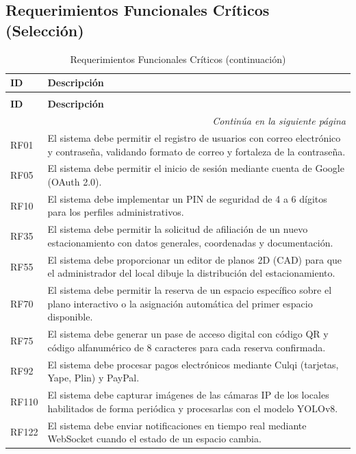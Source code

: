 \subsection{Requerimientos Funcionales Críticos (Selección)}

\begin{longtable}{p{1.2cm} p{12.8cm}}
\caption{Requerimientos Funcionales Críticos} \\
\toprule
\textbf{ID} & \textbf{Descripción} \\
\midrule
\endfirsthead

\caption[]{Requerimientos Funcionales Críticos (continuación)} \\
\toprule
\textbf{ID} & \textbf{Descripción} \\
\midrule
\endhead

\midrule
\multicolumn{2}{r}{\footnotesize\textit{Continúa en la siguiente página}} \\
\endfoot

\bottomrule
\endlastfoot

RF01 & El sistema debe permitir el registro de usuarios con correo electrónico y contraseña, validando formato de correo y fortaleza de la contraseña. \\
RF05 & El sistema debe permitir el inicio de sesión mediante cuenta de Google (OAuth 2.0). \\
RF10 & El sistema debe implementar un PIN de seguridad de 4 a 6 dígitos para los perfiles administrativos. \\
RF35 & El sistema debe permitir la solicitud de afiliación de un nuevo estacionamiento con datos generales, coordenadas y documentación. \\
RF55 & El sistema debe proporcionar un editor de planos 2D (CAD) para que el administrador del local dibuje la distribución del estacionamiento. \\
RF70 & El sistema debe permitir la reserva de un espacio específico sobre el plano interactivo o la asignación automática del primer espacio disponible. \\
RF75 & El sistema debe generar un pase de acceso digital con código QR y código alfanumérico de 8 caracteres para cada reserva confirmada. \\
RF92 & El sistema debe procesar pagos electrónicos mediante Culqi (tarjetas, Yape, Plin) y PayPal. \\
RF110 & El sistema debe capturar imágenes de las cámaras IP de los locales habilitados de forma periódica y procesarlas con el modelo YOLOv8. \\
RF122 & El sistema debe enviar notificaciones en tiempo real mediante WebSocket cuando el estado de un espacio cambia. \\
\end{longtable}

